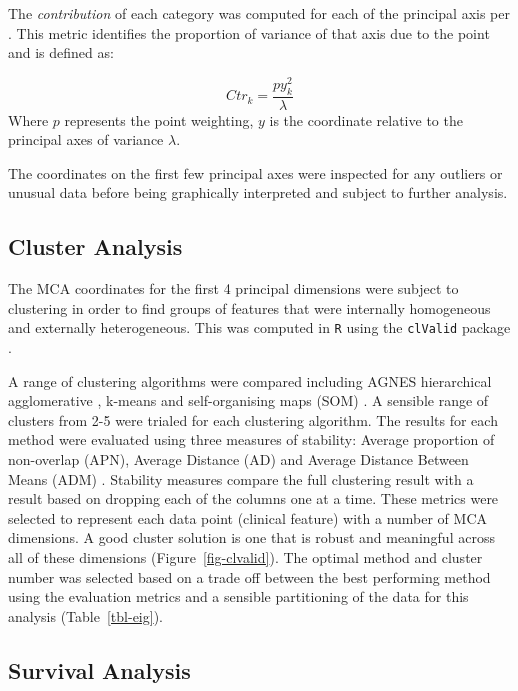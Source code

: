 \documentclass[
  authoryear,
  preprint,
  3p]{elsarticle}
\begin{document}
The \emph{contribution} of each category was computed for each of the
principal axis per \citet{le2010multiple}. This metric identifies the
proportion of variance of that axis due to the point and is defined as:

\[
Ctr_k = \frac{py_k^2}{\lambda}
\] Where \(p\) represents the point weighting, \(y\) is the coordinate
relative to the principal axes of variance \(\lambda\).

The coordinates on the first few principal axes were inspected for any
outliers or unusual data before being graphically interpreted and
subject to further analysis.

\hypertarget{cluster-analysis}{%
\subsection{Cluster Analysis}\label{cluster-analysis}}

The MCA coordinates for the first 4 principal dimensions were subject to
clustering in order to find groups of features that were internally
homogeneous and externally heterogeneous. This was computed in
\texttt{R} using the \texttt{clValid} package \citep{clvalid}.

A range of clustering algorithms were compared including AGNES
hierarchical agglomerative \citep{kaufman2009finding}, k-means
\citep{hartigan1979algorithm} and self-organising maps (SOM)
\citep{kohonen2012self}. A sensible range of clusters from 2-5 were
trialed for each clustering algorithm. The results for each method were
evaluated using three measures of stability: Average proportion of
non-overlap (APN), Average Distance (AD) and Average Distance Between
Means (ADM) \citep{datta2003comparisons}. Stability measures compare the
full clustering result with a result based on dropping each of the
columns one at a time. These metrics were selected to represent each
data point (clinical feature) with a number of MCA dimensions. A good
cluster solution is one that is robust and meaningful across all of
these dimensions (Figure~\ref{fig-clvalid}). The optimal method and
cluster number was selected based on a trade off between the best
performing method using the evaluation metrics and a sensible
partitioning of the data for this analysis (Table~\ref{tbl-eig}).

\hypertarget{survival-analysis}{%
\subsection{Survival Analysis}\label{survival-analysis}}
\end{document}
